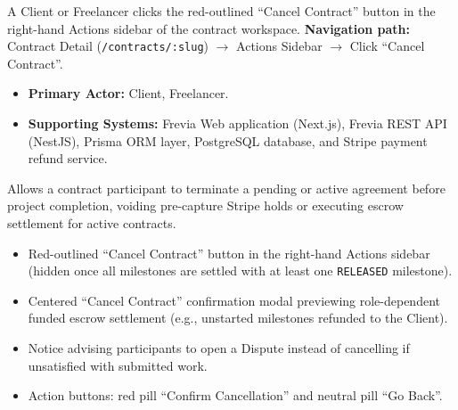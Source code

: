 A Client or Freelancer clicks the red-outlined ``Cancel Contract'' button in the right-hand Actions sidebar of the contract workspace.\newline
\textbf{Navigation path:} Contract Detail (\texttt{/contracts/:slug}) $\rightarrow$ Actions Sidebar $\rightarrow$ Click ``Cancel Contract''.


\begin{itemize}[leftmargin=1.6em,topsep=3pt,itemsep=2pt,parsep=0pt,label=$\bullet$]
      \item \textbf{Primary Actor:} Client, Freelancer.
      \item \textbf{Supporting Systems:} Frevia Web application (Next.js), Frevia REST API (NestJS), Prisma ORM layer, PostgreSQL database, and Stripe payment refund service.
\end{itemize}

\noindent Allows a contract participant to terminate a pending or active agreement before project completion, voiding pre-capture Stripe holds or executing escrow settlement for active contracts.

\begin{itemize}[leftmargin=1.6em,topsep=3pt,itemsep=2pt,parsep=0pt,label=$\bullet$]
      \item Red-outlined ``Cancel Contract'' button in the right-hand Actions sidebar (hidden once all milestones are settled with at least one \texttt{RELEASED} milestone).
      \item Centered ``Cancel Contract'' confirmation modal previewing role-dependent funded escrow settlement (e.g., unstarted milestones refunded to the Client).
      \item Notice advising participants to open a Dispute instead of cancelling if unsatisfied with submitted work.
      \item Action buttons: red pill ``Confirm Cancellation'' and neutral pill ``Go Back''.
\end{itemize}

